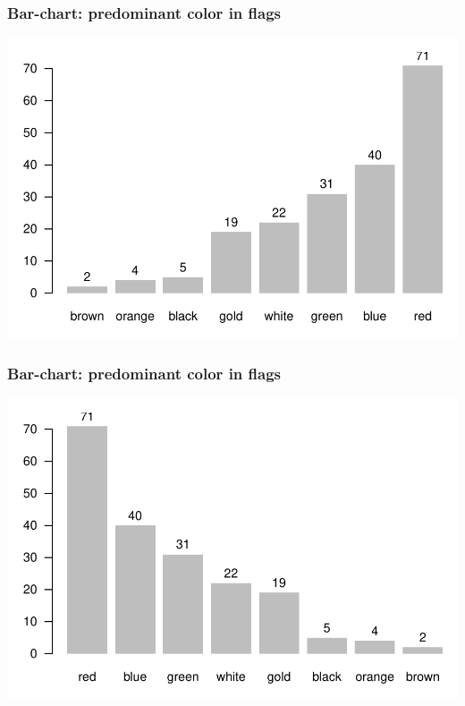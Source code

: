 \documentclass[12pt]{beamer}\usepackage[]{graphicx}\usepackage[]{color}
\newenvironment{knitrout}{}{} %
\begin{document}

\begin{frame}[fragile]
\frametitle{Bar-chart: predominant color in flags}

\begin{knitrout}\footnotesize
{}\color{fgcolor}

{\centering \includegraphics[width=.8\linewidth,height=.6\linewidth]{figure/unnamed-chunk-6-1} 

}



\end{knitrout}

\end{frame}


\begin{frame}[fragile]
\frametitle{Bar-chart: predominant color in flags}

\begin{knitrout}\footnotesize
{}\color{fgcolor}

{\centering \includegraphics[width=.8\linewidth,height=.6\linewidth]{figure/unnamed-chunk-7-1} 

}



\end{knitrout}

\end{frame}
\end{document}
